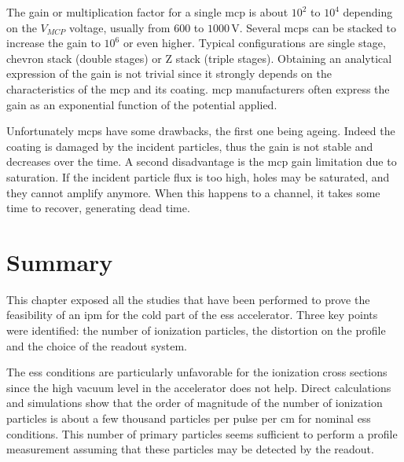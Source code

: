 \begin{refsection}
  

  The gain or multiplication factor for a single \acrshort{mcp} is about $10^{2}$ to $10^{4}$ depending on the $V_{MCP}$ voltage, usually from $600$ to $1000\,\mathrm{V}$. Several \acrshort{mcp}s can be stacked to increase the gain to $10^{6}$ or even higher. Typical configurations are single stage, chevron stack (double stages) or Z stack (triple stages). Obtaining an analytical expression of the gain is not trivial since it strongly depends on the characteristics of the \acrshort{mcp} and its coating. \acrshort{mcp} manufacturers often express the gain as an exponential function of the potential applied.

  

  Unfortunately \acrshort{mcp}s have some drawbacks, the first one being ageing. Indeed the coating is damaged by the incident particles, thus the gain is not stable and decreases over the time. A second disadvantage is the \acrshort{mcp} gain limitation due to saturation. If the incident particle flux is too high, holes may be saturated, and they cannot amplify anymore. When this happens to a channel, it takes some time to recover, generating dead time.


  \section{Summary}
  \label{ch3:Summary}
  This chapter exposed all the studies that have been performed to prove the feasibility of an \acrshort{ipm} for the cold part of the \acrshort{ess} accelerator. Three key points were identified: the number of ionization particles, the distortion on the profile and the choice of the readout system.

  The \acrshort{ess} conditions are particularly unfavorable for the ionization cross sections since the high vacuum level in the accelerator does not help. Direct calculations and simulations show that the order of magnitude of the number of ionization particles is about a few thousand particles per pulse per cm for nominal \acrshort{ess} conditions. This number of primary particles seems sufficient to perform a profile measurement assuming that these particles may be detected by the readout.


\end{refsection}
